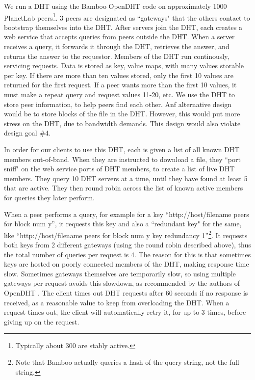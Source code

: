 We run a DHT using the Bamboo OpenDHT code on approximately 1000 PlanetLab peers\footnote{Typically about 300 are stably active.}.  
3 peers are designated as ``gateways" that the others contact to bootstrap themselves into the DHT.  After servers join the DHT, each 
creates a web service that accepts queries from peers outside the DHT.  When a server receives a
query, it forwards it through the DHT, retrieves the answer, and returns the answer to the requestor. 
Members of the DHT run continously, servicing requests.
Data is stored as key, value maps, with many values storable per key.  
If there are more than ten values stored, only the first 10 values are returned for the first request. 
If a peer wants more than the first 10 values, it must make a repeat query and request values 11-20, etc.  
We use the DHT to store peer information, to help peers find each other.  Anf alternative design would be to store blocks of the file in the DHT.  
However, this would put more stress on the DHT, due to bandwidth demands.  This design would also violate design goal \#4.

In order for our clients to use this DHT, each is given a list of all known DHT members out-of-band.  When they are instructed to download a file, 
they ``port sniff" on the web service ports of DHT members, to create a list of live DHT members.  
They query 10 DHT servers at a time, until they have found at least 5 that are active.
They then round robin across the list of known active members for queries they later perform.

When a peer performs a query, for example for a key ``http://host/filename peers for block num y'', it requests this key and also a ``redundant key" for the same, 
like ``http://host/filename peers for block num y key redundancy 1''\footnote{Note that Bamboo actually queries a hash of the query string, not the full string.}.  
It requests both keys from 2 different gateways (using the round robin described above), 
thus the total number of queries per request is 4.  
The reason for this is that sometimes keys are hosted on poorly connected members of the DHT, making response time slow.
Sometimes gateways themselves are temporarily slow, so using multiple gateways per request avoids this slowdown, as recommended by the authors of OpenDHT \cite{opendht_embarrassing}.
The client times out DHT requests after 60 seconds if no response is received, as a reasonable value to keep from 
overloading the DHT.  When a request times out, the client will automatically retry it, for up to 3 times, before giving up on the request.

